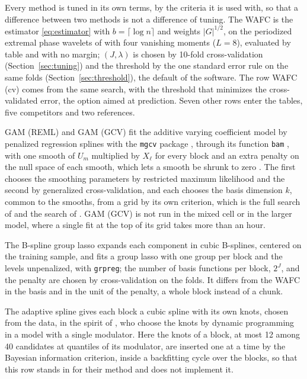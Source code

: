 \documentclass[12pt]{article} %
\theoremstyle{definition}
\theoremstyle{plain}
\newcommand{\cv}{\ell}
\newcommand{\md}{m}
\newcommand{\pen}{\lambda}
\begin{document}
{Every method is tuned in its own terms, by the criteria it is used with, so
that a difference between two methods is not a difference of tuning. The WAFC
is the estimator \eqref{eq:estimator} with $b = \lceil\log n\rceil$ and
weights $|G|^{1/2}$, on the periodized extremal phase wavelets of
\citet{Daubechies-1992} with four vanishing moments ($L = 8$), evaluated by
table and with no margin; $(J,\pen)$ is chosen by 10-fold cross-validation
(Section~\ref{sec:tuning}) and the threshold by the one standard error rule on
the same folds (Section~\ref{sec:threshold}), the default of the software. The
row WAFC (cv) comes from the same search, with the threshold that minimizes
the cross-validated error, the option aimed at prediction. Seven other rows
enter the tables, five competitors and two references.

GAM (REML) and GAM (GCV) fit the additive varying coefficient model by
penalized regression splines with the \texttt{mgcv} package
\citep{Wood-2017,Wood-mgcv-2025}, through its function \texttt{bam}
\citep{Wood-Goude-Shaw-2015}, with one smooth of $U_\md$ multiplied by $X_\cv$
for every block and an extra penalty on the null space of each smooth, which
lets a smooth be shrunk to zero \citep{Marra-Wood-2011}. The first chooses the
smoothing parameters by restricted maximum likelihood and the second by
generalized cross-validation, and each chooses the basis dimension $k$, common
to the smooths, from a grid by its own criterion, which is the full search of
\citet{Ruppert-2002} and the search of \citet[Section~2.3]{Pya-Wood-2016}. GAM
(GCV) is not run in the mixed cell or in the larger model, where a single fit
at the top of its grid takes more than an hour.

The B-spline group lasso expands each component in cubic B-splines, centered
on the training sample, and fits a group lasso \citep{Yuan-Lin-2006} with one
group per block and the levels unpenalized, with \texttt{grpreg}; the number
of basis functions per block, $2^J$, and the penalty are chosen by
cross-validation on the folds. It differs from the WAFC in the basis and in
the unit of the penalty, a whole block instead of a chunk.

The adaptive spline gives each block a cubic spline with its own knots, chosen
from the data, in the spirit of \citet{Wang-Jiang-Liu-2024}, who choose the
knots by dynamic programming in a model with a single modulator. Here the
knots of a block, at most 12 among 40 candidates at quantiles of its
modulator, are inserted one at a time by the Bayesian information criterion,
inside a backfitting cycle over the blocks, so that this row stands in for
their method and does not implement it.

}
\end{document}
